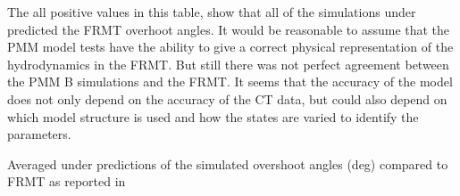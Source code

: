 The all positive values in this table, show that all of the simulations under predicted the FRMT overhoot angles. 
It would be reasonable to assume that the PMM model tests have the ability to give a correct physical representation of the hydrodynamics in the FRMT. But still there was not perfect agreement between the PMM B simulations and the FRMT. It seems that the accuracy of the model does not only depend on the accuracy of the CT data, but could also depend on which model structure is used and how the states are varied to identify the parameters.
\begin{table}[h]
    \centering
    \caption{Averaged under predictions of the simulated overshoot angles (deg) compared to FRMT as reported in \textcite{liuPredictionsShipManeuverability2018}}
    \label{tab:liu2018}
\end{table}